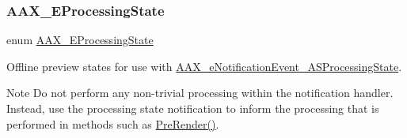 \subsubsection{\texorpdfstring{AAX\_EProcessingState}{AAX\_EProcessingState}}
{\footnotesize\ttfamily enum \mbox{\hyperlink{a00491_a6ec854be40c8cf810dec97de3e56c0a7}{A\+A\+X\+\_\+\+E\+Processing\+State}}}



Offline preview states for use with \mbox{\hyperlink{a00491_afab5ea2cfd731fc8f163b6caa685406eaa55c7e25741c0d4f81cc49394e96a43c}{A\+A\+X\+\_\+e\+Notification\+Event\+\_\+\+A\+S\+Processing\+State}}. 

\begin{DoxyNote}{Note}
Do not perform any non-\/trivial processing within the notification handler. Instead, use the processing state notification to inform the processing that is performed in methods such as \mbox{\hyperlink{a01485_a20a99c657e4d12f446e965c567fdd711}{Pre\+Render()}}. 
\end{DoxyNote}
